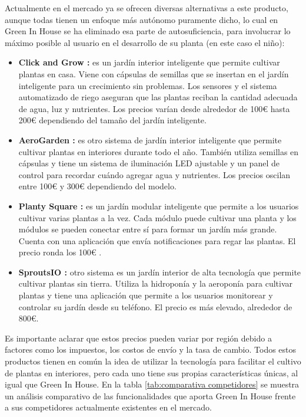             Actualmente en el mercado ya se ofrecen diversas alternativas a este producto, aunque todas tienen un enfoque más autónomo puramente dicho, lo cual en Green In House se ha eliminado esa parte de autosuficiencia, para involucrar lo máximo posible al usuario  en el desarrollo de su planta (en este caso el niño):
            \begin{itemize}      
                \item \textbf{Click and Grow :} es un jardín interior inteligente que permite cultivar plantas en casa. Viene con cápsulas de semillas que se insertan en el jardín inteligente para un crecimiento sin problemas. Los sensores y el sistema automatizado de riego aseguran que las plantas reciban la cantidad adecuada de agua, luz y nutrientes. Los precios varían desde alrededor de 100€ hasta 200€ dependiendo del tamaño del jardín inteligente.
                \item \textbf{AeroGarden :} es otro sistema de jardín interior inteligente que permite cultivar plantas en interiores durante todo el año. También utiliza semillas en cápsulas y tiene un sistema de iluminación LED ajustable y un panel de control para recordar cuándo agregar agua y nutrientes. Los precios oscilan entre 100€ y 300€ dependiendo del modelo.
                \item \textbf{Planty Square :} es un jardín modular inteligente que permite a los usuarios cultivar varias plantas a la vez. Cada módulo puede cultivar una planta y los módulos se pueden conectar entre sí para formar un jardín más grande. Cuenta con una aplicación que envía notificaciones para regar las plantas. El precio ronda los 100€ .
                \item \textbf{SproutsIO :} otro sistema es un jardín interior de alta tecnología que permite cultivar plantas sin tierra. Utiliza la hidroponía y la aeroponía para cultivar plantas y tiene una aplicación que permite a los usuarios monitorear y controlar su jardín desde su teléfono. El precio es más elevado, alrededor de 800€.
            \end{itemize}
            Es importante aclarar que estos precios pueden variar por región debido a factores como los impuestos, los costos de envío y la tasa de cambio. Todos estos productos tienen en común la idea de utilizar la tecnología para facilitar el cultivo de plantas en interiores, pero cada uno tiene sus propias características únicas, al igual que Green In House. En la tabla \ref{tab:comparativa competidores} se muestra un análisis comparativo de las funcionalidades que aporta Green In House frente a sus competidores actualmente existentes en el mercado.
